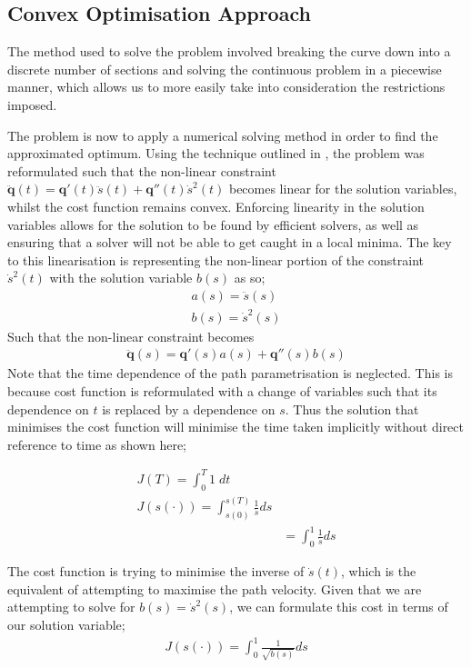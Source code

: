 \subsection{Convex Optimisation Approach}
The method used to solve the problem involved breaking the curve down into a discrete number of sections and solving the continuous problem in a piecewise manner, which allows us to more easily take into consideration the restrictions imposed.

The problem is now to apply a numerical solving method in order to find the approximated optimum. Using the technique outlined in \cite{Schutter09}, the problem was reformulated such that the non-linear constraint $\ddot{\textbf{q}}(t) = \textbf{q}'(t)\ddot{s}(t) + \textbf{q}''(t)\dot{s}^2(t)$ becomes linear for the solution variables, whilst the cost function remains convex. Enforcing linearity in the solution variables allows for the solution to be found by efficient solvers, as well as ensuring that a solver will not be able to get caught in a local minima.
The key to this linearisation is representing the non-linear portion of the constraint $\dot{s}^2(t)$ with the solution variable $b(s)$ as so;
\begin{align*}
a(s) = \ddot{s}(s)\\
b(s) = \dot{s}^2(s)
\end{align*}
Such that the non-linear constraint becomes
\begin{align*}
\ddot{\textbf{q}}(s) = \textbf{q}'(s)a(s) + \textbf{q}''(s)b(s)
\end{align*}
Note that the time dependence of the path parametrisation is neglected. This is because cost function is reformulated with a change of variables such that its dependence on $t$ is replaced by a dependence on $s$. Thus the solution that minimises the cost function will minimise the time taken implicitly without direct reference to time as shown here;

\begin{align*}
J(T) = \int_0^T1\;dt\\
J(s(\cdot)) = \int_{s(0)}^{s(T)} \frac{1}{\dot{s}}ds\\
	&= \int_0^1\frac{1}{\dot{s}}ds
\end{align*}

The cost function is trying to minimise the inverse of $\dot{s}(t)$, which is the equivalent of attempting to maximise the path velocity. Given that we are attempting to solve for $b(s) = \dot{s}^2(s)$, we can formulate this cost in terms of our solution variable;
\begin{align*}
J(s(\cdot)) = \int_0^1\frac{1}{\sqrt{b(s)}}ds
\end{align*}

